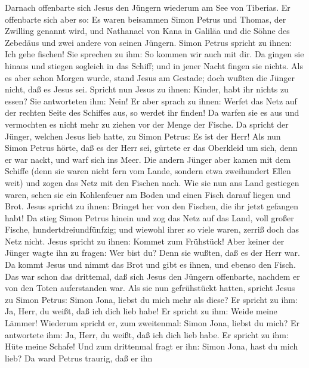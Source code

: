  Darnach offenbarte sich Jesus den Jüngern wiederum am See
von Tiberias. Er offenbarte sich aber so:  Es waren
beisammen Simon Petrus und Thomas, der Zwilling genannt wird, und
Nathanael von Kana in Galiläa und die Söhne des Zebedäus und zwei andere
von seinen Jüngern.  Simon Petrus spricht zu ihnen: Ich
gehe fischen! Sie sprechen zu ihm: So kommen wir auch mit dir. Da gingen
sie hinaus und stiegen sogleich in das Schiff; und in jener Nacht fingen
sie nichts.  Als es aber schon Morgen wurde, stand Jesus
am Gestade; doch wußten die Jünger nicht, daß es Jesus sei.
 Spricht nun Jesus zu ihnen: Kinder, habt ihr nichts zu
essen? Sie antworteten ihm: Nein!  Er aber sprach zu
ihnen: Werfet das Netz auf der rechten Seite des Schiffes aus, so werdet
ihr finden! Da warfen sie es aus und vermochten es nicht mehr zu ziehen
vor der Menge der Fische.  Da spricht der Jünger, welchen
Jesus lieb hatte, zu Simon Petrus: Es ist der Herr! Als nun Simon Petrus
hörte, daß es der Herr sei, gürtete er das Oberkleid um sich, denn er
war nackt, und warf sich ins Meer.  Die andern Jünger aber
kamen mit dem Schiffe (denn sie waren nicht fern vom Lande, sondern etwa
zweihundert Ellen weit) und zogen das Netz mit den Fischen nach.
 Wie sie nun ans Land gestiegen waren, sehen sie ein
Kohlenfeuer am Boden und einen Fisch darauf liegen und Brot.
 Jesus spricht zu ihnen: Bringet her von den Fischen, die
ihr jetzt gefangen habt!  Da stieg Simon Petrus hinein
und zog das Netz auf das Land, voll großer Fische,
hundertdreiundfünfzig; und wiewohl ihrer so viele waren, zerriß doch das
Netz nicht.  Jesus spricht zu ihnen: Kommet zum
Frühstück! Aber keiner der Jünger wagte ihn zu fragen: Wer bist du? Denn
sie wußten, daß es der Herr war.  Da kommt Jesus und
nimmt das Brot und gibt es ihnen, und ebenso den Fisch. 
Das war schon das drittemal, daß sich Jesus den Jüngern offenbarte,
nachdem er von den Toten auferstanden war.  Als sie nun
gefrühstückt hatten, spricht Jesus zu Simon Petrus: Simon Jona, liebst
du mich mehr als diese? Er spricht zu ihm: Ja, Herr, du weißt, daß ich
dich lieb habe! Er spricht zu ihm: Weide meine Lämmer! 
Wiederum spricht er, zum zweitenmal: Simon Jona, liebst du mich? Er
antwortete ihm: Ja, Herr, du weißt, daß ich dich lieb habe. Er spricht
zu ihm: Hüte meine Schafe!  Und zum drittenmal fragt er
ihn: Simon Jona, hast du mich lieb? Da ward Petrus traurig, daß er ihn
